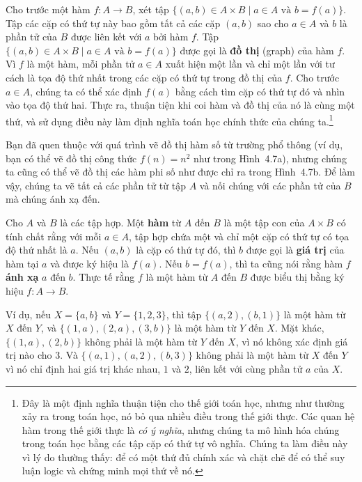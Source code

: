 Cho trước một hàm $f\colon A \to B$, xét tập $\{(a,b) \in A \times B \mid a \in A \text{ và } b = f(a)\}$. Tập các cặp có thứ tự này bao gồm tất cả các cặp $(a,b)$ sao cho $a \in A$ và $b$ là phần tử của $B$ được liên kết với $a$ bởi hàm $f$. Tập $\{(a,b) \in A \times B \mid a \in A \text{ và } b = f(a)\}$ được gọi là \textbf{đồ thị} (graph) của hàm $f$. Vì $f$ là một hàm, mỗi phần tử $a \in A$ xuất hiện một lần và chỉ một lần với tư cách là tọa độ thứ nhất trong các cặp có thứ tự trong đồ thị của $f$. Cho trước $a \in A$, chúng ta có thể xác định $f(a)$ bằng cách tìm cặp có thứ tự đó và nhìn vào tọa độ thứ hai. Thực ra, thuận tiện khi coi hàm và đồ thị của nó là cùng một thứ, và sử dụng điều này làm định nghĩa toán học chính thức của chúng ta.\footnote{Đây là một định nghĩa thuận tiện cho thế giới toán học, nhưng như thường xảy ra trong toán học, nó bỏ qua nhiều điều trong thế giới thực. Các quan hệ hàm trong thế giới thực là \emph{có ý nghĩa}, nhưng chúng ta mô hình hóa chúng trong toán học bằng các tập cặp có thứ tự vô nghĩa. Chúng ta làm điều này vì lý do thường thấy: để có một thứ đủ chính xác và chặt chẽ để có thể suy luận logic và chứng minh mọi thứ về nó.}

Bạn đã quen thuộc với quá trình vẽ đồ thị hàm số từ trường phổ thông (ví dụ, bạn có thể vẽ đồ thị công thức $f(n) = n^2$ như trong Hình~4.7a), nhưng chúng ta cũng có thể vẽ đồ thị các hàm phi số như được chỉ ra trong Hình~4.7b. Để làm vậy, chúng ta vẽ tất cả các phần tử từ tập $A$ và nối chúng với các phần tử của $B$ mà chúng ánh xạ đến.

\begin{definition}
Cho $A$ và $B$ là các tập hợp. Một \textbf{hàm} từ $A$ đến $B$ là một tập con của $A \times B$ có tính chất rằng với mỗi $a \in A$, tập hợp chứa một và chỉ một cặp có thứ tự có tọa độ thứ nhất là $a$. Nếu $(a,b)$ là cặp có thứ tự đó, thì $b$ được gọi là \textbf{giá trị} của hàm tại $a$ và được ký hiệu là $f(a)$. Nếu $b = f(a)$, thì ta cũng nói rằng hàm $f$ \textbf{ánh xạ} $a$ đến $b$. Thực tế rằng $f$ là một hàm từ $A$ đến $B$ được biểu thị bằng ký hiệu $f\colon A \to B$.
\end{definition}

\begin{example}
Ví dụ, nếu $X = \{a,b\}$ và $Y = \{1,2,3\}$, thì tập $\{(a,2),(b,1)\}$ là một hàm từ $X$ đến $Y$, và $\{(1,a),(2,a),(3,b)\}$ là một hàm từ $Y$ đến $X$. Mặt khác, $\{(1,a),(2,b)\}$ không phải là một hàm từ $Y$ đến $X$, vì nó không xác định giá trị nào cho $3$. Và $\{(a,1),(a,2),(b,3)\}$ không phải là một hàm từ $X$ đến $Y$ vì nó chỉ định hai giá trị khác nhau, $1$ và $2$, liên kết với cùng phần tử $a$ của $X$.
\end{example}

